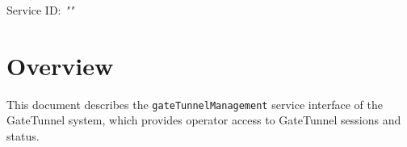 \documentclass[a4paper]{arrowhead}
\begin{document}
\sloppy

\ArrowheadSetup

\begin{center}
  \vspace*{1cm}
  \huge{\arrowtitle}

  \vspace*{0.2cm}
  \LARGE{\arrowtype}
  \vspace*{1cm}

  \Large{Service ID: \textit{"\arrowid"}}

  \vspace*{\fill}


  \vspace*{1cm}
  \vspace*{\fill}

  \begin{abstract}
    This document describes the HTTP/1.1 protocol with TLS payload security and JSON payload encoding variant of the \texttt{gate\allowbreak{}Tunnel\allowbreak{}Management} service of the GateTunnel system.
  \end{abstract}

  \vspace*{1cm}
\end{center}

\newpage

\tableofcontents
\newpage

\section{Overview}
\label{sec:overview}

This document describes the \texttt{gate\allowbreak{}Tunnel\allowbreak{}Management} service interface of the GateTunnel system, which provides operator access to GateTunnel sessions and status.
\end{document}
